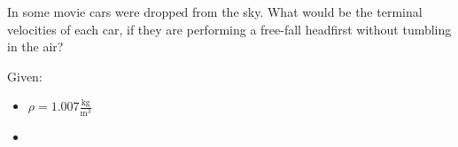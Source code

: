 
In some movie cars were dropped from the sky.
What would be the terminal velocities of each car, if they are
performing a free-fall headfirst without tumbling in the air?

\bigbreak Given:
\begin{itemize}
    \item $\rho = 1.007 \frac{\text{kg}}{\text{m}^3}$
    \item $ $
\end{itemize}

